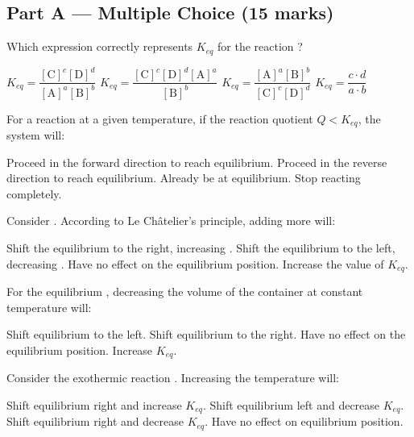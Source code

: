 \documentclass[addpoints]{exam}
\begin{document}
\newpage
\begin{questions}

\section*{Part A --- Multiple Choice (15 marks)}
\vspace{5mm}

\question[1] Which expression correctly represents $K_{eq}$ for the reaction
?
\begin{choices}
    \correctchoice $K_{eq} = \dfrac{[\text{C}]^c[\text{D}]^d}{[\text{A}]^a[\text{B}]^b}$
    \choice $K_{eq} = \dfrac{[\text{C}]^c[\text{D}]^d[\text{A}]^a}{[\text{B}]^b}$
    \choice $K_{eq} = \dfrac{[\text{A}]^a[\text{B}]^b}{[\text{C}]^c[\text{D}]^d}$
    \choice $K_{eq} = \dfrac{c \cdot d}{a \cdot b}$
\end{choices}

\question[1] For a reaction at a given temperature, if the reaction quotient $Q < K_{eq}$,
the system will:
\begin{choices}
    \correctchoice Proceed in the forward direction to reach equilibrium.
    \choice Proceed in the reverse direction to reach equilibrium.
    \choice Already be at equilibrium.
    \choice Stop reacting completely.
\end{choices}

\question[1] Consider . According to Le Ch\^{a}telier's
principle, adding more  will:
\begin{choices}
    \correctchoice Shift the equilibrium to the right, increasing \ce{[NH3]}.
    \choice Shift the equilibrium to the left, decreasing \ce{[NH3]}.
    \choice Have no effect on the equilibrium position.
    \choice Increase the value of $K_{eq}$.
\end{choices}

\question[1] For the equilibrium , decreasing the volume
of the container at constant temperature will:
\begin{choices}
    \choice Shift equilibrium to the left.
    \correctchoice Shift equilibrium to the right.
    \choice Have no effect on the equilibrium position.
    \choice Increase $K_{eq}$.
\end{choices}

\question[1] Consider the exothermic reaction . Increasing the temperature
will:
\begin{choices}
    \choice Shift equilibrium right and increase $K_{eq}$.
    \correctchoice Shift equilibrium left and decrease $K_{eq}$.
    \choice Shift equilibrium right and decrease $K_{eq}$.
    \choice Have no effect on equilibrium position.
\end{choices}


\end{questions}
\end{document}
